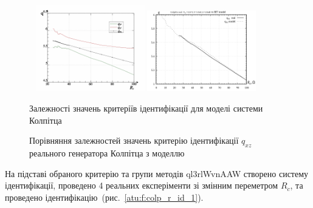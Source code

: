 \documentclass[a4paper,13pt]{atuaref}
\begin{document}
\begin{figure}[htb!]
\begin{center}
  ~ \hfill
  \includegraphics[width=0.42\textwidth]{p6/p/colp_read_q-p_Rc_q.png}
  \hfill
  \includegraphics[width=0.42\textwidth]{p6/p/colp_q_cml.png}
  \hfill ~
\end{center}
\vspace{-2.0ex}
\parbox[t]{0.45\textwidth}{
  \caption{Залежності значень критеріїв ідентифікації для моделі системи Колпітца}
  \label{atu:f:colp_bjt_q-p_Rc_q}
}
\hfill
\parbox[t]{0.45\textwidth}{
  \caption{Порівняння залежностей значень критерію ідентифікації $q_{xz}$ реального генератора Колпітца з моделлю}
  \label{atu:f:colp_q_cml}
}
\end{figure}

На підставі обраного критерію та групи методів ql3rlWvnAAW створено систему ідентифікації,
проведено 4 реальних експеріменти зі змінним переметром $R_c$,
та проведено ідентифікацію~(рис.~\ref{atu:f:colp_r_id_1}).
\end{document}
